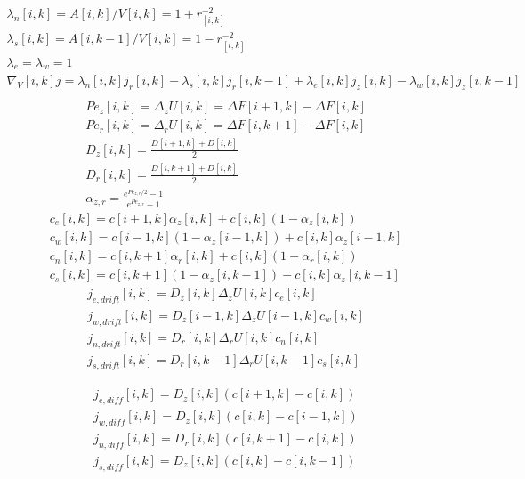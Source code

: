 \documentclass[12pt, a4paper]{article}
\begin{document}
\begin{eqnarray}
    \lambda_{n}[i,k] = A[i,k]/V[i,k] = 1+r_[i,k]^{-2}
    \\
    \lambda_{s}[i,k] = A[i,k-1]/V[i,k] = 1-r_[i,k]^{-2}
    \\
    \lambda_{e} = \lambda_{w} = 1
    \\
    \nabla_V[i, k] j = \lambda_{n}[i,k] j_r[i,k] - \lambda_{s}[i,k] j_r[i,k-1] + \lambda_{e}[i,k] j_z[i,k] - \lambda_{w}[i,k] j_z[i,k-1]
    \\
\end{eqnarray}
\begin{eqnarray}
    Pe_{z}[i,k] = \Delta_{z} U[i,k] = \Delta F[i+1, k] - \Delta F[i, k]
    \\
    Pe_{r}[i,k] = \Delta_{r} U[i,k] = \Delta F[i, k+1] - \Delta F[i, k]
    \\
    D_{z}[i,k] = \frac{D[i+1,k] + D[i,k]}{2}
    \\
    D_{r}[i,k] = \frac{D[i,k+1] + D[i,k]}{2}
    \\
    \alpha_{z,r} = \frac{e^{Pe_{z,r}/2} - 1}{e^{Pe_{z,r}} - 1}
\end{eqnarray}
\begin{eqnarray}
    c_{e}[i,k] = c[i+1,k] \alpha_{z}[i,k] + c[i, k] (1 - \alpha_{z}[i,k])
    \\
    c_{w}[i,k] = c[i-1,k] (1-\alpha_{z}[i-1,k]) + c[i, k] \alpha_{z}[i-1,k]
    \\
    c_{n}[i,k] = c[i,k+1] \alpha_{r}[i,k] + c[i, k] (1 - \alpha_{r}[i,k])
    \\
    c_{s}[i,k] = c[i,k+1] (1-\alpha_{z}[i,k-1]) + c[i, k] \alpha_{z}[i,k-1]
\end{eqnarray}
\begin{eqnarray}
    j_{e, drift}[i,k] = D_z[i,k] \Delta_{z} U[i,k] c_e[i,k]
    \\
    j_{w, drift}[i,k] = D_z[i-1,k] \Delta_{z} U[i-1,k] c_w[i,k]
    \\
    j_{n, drift}[i,k] = D_r[i,k] \Delta_{r} U[i,k] c_n[i,k]
    \\
    j_{s, drift}[i,k] = D_r[i,k-1] \Delta_{r} U[i,k-1] c_s[i,k]
\end{eqnarray}

\begin{eqnarray}
    j_{e, diff}[i,k] = D_z[i,k]  (c[i+1,k] - c[i,k])
    \\
    j_{w, diff}[i,k] = D_z[i,k]  (c[i,k] - c[i-1,k])
    \\
    j_{n, diff}[i,k] = D_r[i,k]  (c[i,k+1] - c[i,k])
    \\
    j_{s, diff}[i,k] = D_z[i,k]  (c[i,k] - c[i,k-1])
\end{eqnarray}
\end{document}

